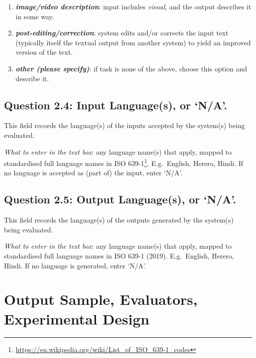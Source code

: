 \documentclass[11pt,a4paper]{article}
\makeatletter
\newcommand{\egcvalue}[1]{\textbf{\textit{#1}}}
\newcommand\footnoteref[1]{\protected@xdef\@thefnmark{\ref{#1}}\@footnotemark}
\makeatother
\begin{document}
\begin{enumerate}[itemsep=0cm,leftmargin=0.5cm,label={\small $\square$}]
    \item \egcvalue{image/video description}: input includes \textit{visual}, and the output describes it in some way.
    
    \item \egcvalue{post-editing/correction}: system edits and/or corrects the input text (typically itself the textual output from another system) to yield an improved version of the text.
       
    \item \egcvalue{other (please specify)}: if task is none of the above, choose this option and describe it.
    \end{enumerate}


\vspace{-.3cm}
\subsection*{Question 2.4: Input Language(s), or `N/A'.}
\vspace{-.1cm}

This field records the language(s) of the inputs accepted by the system(s) being evaluated.
        
\vspace{.3cm}
\noindent\textit{What to enter in the text box}: any  language name(s) that apply, mapped to standardised full language names in ISO 639-1\footnote{\label{iso}\url{https://en.wikipedia.org/wiki/List_of_ISO_639-1_codes}}. E.g.\ English, Herero, Hindi. 
If no language is accepted as (part of) the input, enter `N/A'.
        
\vspace{-.3cm}
\subsection*{Question 2.5: Output Language(s), or `N/A'.}
\vspace{-.1cm}

This field records the language(s) of the outputs generated by the system(s) being evaluated.
        
\vspace{.2cm}
\noindent\textit{What to enter in the text box}: any  language name(s) that apply, mapped to standardised full language names in ISO 639-1 (2019)\footnoteref{iso}. E.g.\ English, Herero, Hindi. 
If no language is generated, enter `N/A'.


\section{Output Sample, Evaluators, Experimental Design}\label{sec:design}
\end{document}
